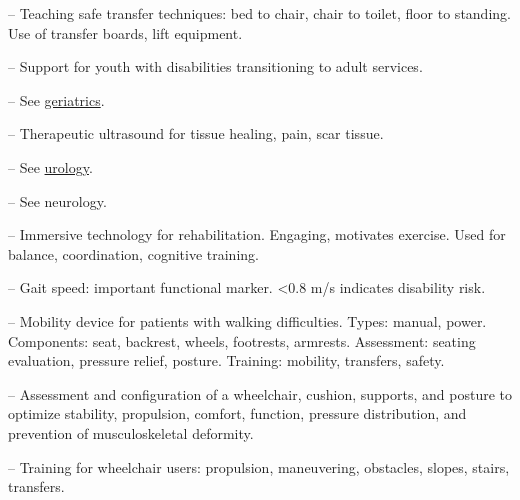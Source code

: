 -- Teaching safe transfer techniques: bed to chair, chair to toilet, floor to standing. Use of transfer boards, lift equipment.

-- Support for youth with disabilities transitioning to adult services.

-- See \hyperlink{Geriatrics}{geriatrics}.

-- Therapeutic ultrasound for tissue healing, pain, scar tissue.

-- See \hyperlink{Urology}{urology}.

-- See neurology.

-- Immersive technology for rehabilitation. Engaging, motivates exercise. Used for balance, coordination, cognitive training.

-- Gait speed: important functional marker. <0.8 m/s indicates disability risk.

-- Mobility device for patients with walking difficulties. Types: manual, power. Components: seat, backrest, wheels, footrests, armrests. Assessment: seating evaluation, pressure relief, posture. Training: mobility, transfers, safety.

-- Assessment and configuration of a wheelchair, cushion, supports, and posture to optimize stability, propulsion, comfort, function, pressure distribution, and prevention of musculoskeletal deformity.

-- Training for wheelchair users: propulsion, maneuvering, obstacles, slopes, stairs, transfers.
